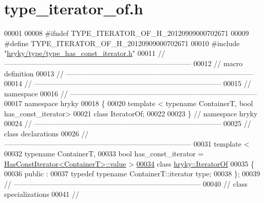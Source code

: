 \hypertarget{type__iterator__of_8h_source}{\section{type\-\_\-iterator\-\_\-of.\-h}
}

\begin{DoxyCode}
00001 
00008 \textcolor{preprocessor}{#ifndef TYPE\_ITERATOR\_OF\_H\_20120909000702671}
00009 \textcolor{preprocessor}{}\textcolor{preprocessor}{#define TYPE\_ITERATOR\_OF\_H\_20120909000702671}
00010 \textcolor{preprocessor}{}\textcolor{preprocessor}{#include "\hyperlink{type__has__const__iterator_8h}{hryky/type/type_has_const_iterator.h}"}
00011 \textcolor{comment}{//
      ------------------------------------------------------------------------------}
00012 \textcolor{comment}{// macro definition}
00013 \textcolor{comment}{//
      ------------------------------------------------------------------------------}
00014 \textcolor{comment}{//
      ------------------------------------------------------------------------------}
00015 \textcolor{comment}{// namespace}
00016 \textcolor{comment}{//
      ------------------------------------------------------------------------------}
00017 \textcolor{keyword}{namespace }hryky
00018 \{
00020     \textcolor{keyword}{template} < \textcolor{keyword}{typename} ContainerT, \textcolor{keywordtype}{bool} has\_const\_iterator>
00021     \textcolor{keyword}{class }IteratorOf;
00022 
00023 \} \textcolor{comment}{// namespace hryky}
00024 \textcolor{comment}{//
      ------------------------------------------------------------------------------}
00025 \textcolor{comment}{// class declarations}
00026 \textcolor{comment}{//
      ------------------------------------------------------------------------------}
00031 \textcolor{comment}{}\textcolor{keyword}{template} <
00032     \textcolor{keyword}{typename} ContainerT,
00033     \textcolor{keywordtype}{bool} has\_const\_iterator = \hyperlink{namespacehryky_1_1log_1_1format_a5b9af9c1a7b018d54144acfb1b8cc960}{HasConstIterator<ContainerT>::value} >
\hypertarget{type__iterator__of_8h_source_l00034}{}\hyperlink{classhryky_1_1_iterator_of}{00034} \textcolor{keyword}{class }\hyperlink{classhryky_1_1_iterator_of}{hryky::IteratorOf}
00035 \{
00036 \textcolor{keyword}{public} :
00037     \textcolor{keyword}{typedef} \textcolor{keyword}{typename} ContainerT::iterator type;
00038 \};
00039 \textcolor{comment}{//
      ------------------------------------------------------------------------------}
00040 \textcolor{comment}{// class specializations}
00041 \textcolor{comment}{//
}
\end{DoxyCode}

